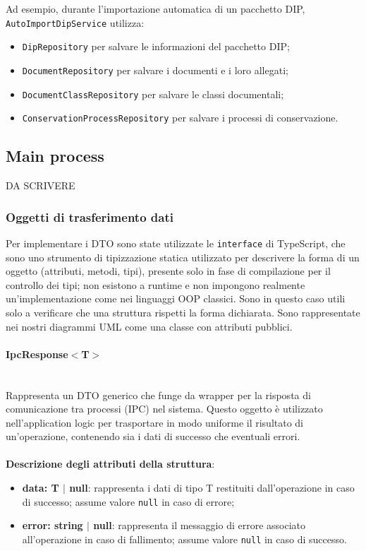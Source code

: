 \documentclass[a4paper,12pt]{article}
\begin{document}
{{{                \noindent Ad esempio, durante l'importazione automatica di un pacchetto DIP, \texttt{AutoImportDipService} utilizza:
                \begin{itemize}
                    \item \texttt{DipRepository} per salvare le informazioni del pacchetto DIP;
                    \item \texttt{DocumentRepository} per salvare i documenti e i loro allegati;
                    \item \texttt{DocumentClassRepository} per salvare le classi documentali;
                    \item \texttt{ConservationProcessRepository} per salvare i processi di conservazione.
                \end{itemize}
            }
        }

        \subsection{Main process} {
            DA SCRIVERE
            
            \subsubsection{Oggetti di trasferimento dati} {
                Per implementare i DTO sono state utilizzate le \verb|interface| di TypeScript, che sono uno strumento di tipizzazione statica utilizzato per descrivere la forma di un oggetto (attributi, metodi, tipi), presente solo in fase di compilazione per il controllo dei tipi; non esistono a runtime e non impongono realmente un'implementazione come nei linguaggi OOP classici. Sono in questo caso utili solo a verificare che una struttura rispetti la forma dichiarata. Sono rappresentate nei nostri diagrammi UML come una classe con attributi pubblici.  
                \paragraph{IpcResponse$<$T$>$}\label{par:IpcResponse}\mbox{}\\
                Rappresenta un DTO generico che funge da wrapper per la risposta di comunicazione tra processi (IPC) nel sistema. Questo oggetto è utilizzato nell'application logic per trasportare in modo uniforme il risultato di un'operazione, contenendo sia i dati di successo che eventuali errori.\\
                \\
                \textbf{Descrizione degli attributi della struttura}:
                \begin{itemize}
                    \item \textbf{data: T $|$ null}: rappresenta i dati di tipo T restituiti dall'operazione in caso di successo; assume valore \texttt{null} in caso di errore;
                    \item \textbf{error: string $|$ null}: rappresenta il messaggio di errore associato all'operazione in caso di fallimento; assume valore \texttt{null} in caso di successo.
                \end{itemize}
                
}}}
\end{document}
